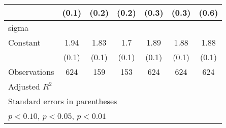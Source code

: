 \begin{table}[htbp]
\begin{tabular}{l*{6}{c}}
                &    (0.1)         &    (0.2)         &    (0.2)         &    (0.3)         &    (0.3)         &    (0.6)         \\
\hline
sigma           &                  &                  &                  &                  &                  &                  \\
Constant        &     1.94\sym{***}&     1.83\sym{***}&      1.7\sym{***}&     1.89\sym{***}&     1.88\sym{***}&     1.88\sym{***}\\
                &    (0.1)         &    (0.1)         &    (0.1)         &    (0.1)         &    (0.1)         &    (0.1)         \\
\hline
Observations    &      624         &      159         &      153         &      624         &      624         &      624         \\
Adjusted \(R^{2}\)&                  &                  &                  &                  &                  &                  \\
\hline\hline
\multicolumn{7}{l}{\footnotesize Standard errors in parentheses}\\
\multicolumn{7}{l}{\footnotesize \sym{*} \(p<0.10\), \sym{**} \(p<0.05\), \sym{***} \(p<0.01\)}\\
\end{tabular}
\end{table}
